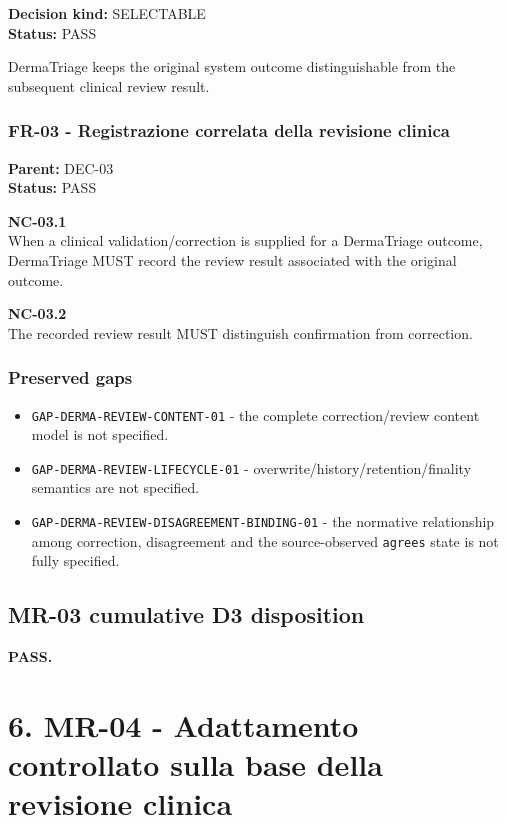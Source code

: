 \documentclass[11pt,a4paper]{article}
\providecommand{\tightlist}{\setlength{\itemsep}{0pt}\setlength{\parskip}{0pt}}
\begin{document}
\textbf{Decision kind:} SELECTABLE\\
\textbf{Status:} PASS

DermaTriage keeps the original system outcome distinguishable from the
subsequent clinical review result.

\subsubsection{FR-03 - Registrazione correlata della revisione
clinica}\label{fr-03---registrazione-correlata-della-revisione-clinica}

\textbf{Parent:} DEC-03\\
\textbf{Status:} PASS

\textbf{NC-03.1}\\
When a clinical validation/correction is supplied for a DermaTriage
outcome, DermaTriage MUST record the review result associated with the
original outcome.

\textbf{NC-03.2}\\
The recorded review result MUST distinguish confirmation from
correction.

\subsubsection{Preserved gaps}\label{preserved-gaps-1}

\begin{itemize}
\tightlist
\item
  \texttt{GAP-DERMA-REVIEW-CONTENT-01} - the complete correction/review
  content model is not specified.
\item
  \texttt{GAP-DERMA-REVIEW-LIFECYCLE-01} -
  overwrite/history/retention/finality semantics are not specified.
\item
  \texttt{GAP-DERMA-REVIEW-DISAGREEMENT-BINDING-01} - the normative
  relationship among correction, disagreement and the source-observed
  \texttt{agrees} state is not fully specified.
\end{itemize}

\subsection{MR-03 cumulative D3
disposition}\label{mr-03-cumulative-d3-disposition}

\textbf{PASS.}

\section{6. MR-04 - Adattamento controllato sulla base della revisione
clinica}\label{6-mr-04---adattamento-controllato-sulla-base-della-revisione-clinica}
\end{document}
